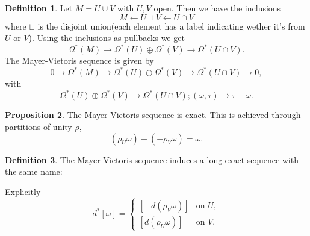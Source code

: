 \documentclass[twocolumn]{article}
\theoremstyle{definition}
\newtheorem{definition}{Definition}[section]
\newtheorem{proposition}[definition]{Proposition}
\theoremstyle{remark}
\begin{document}
\begin{definition}
    Let $M = U \cup V$ with $U, V$ open. Then we have the inclusions
    \begin{equation}
        M \leftarrow U \sqcup V \leftarrow U \cap V
    \end{equation}
    where $\sqcup$ is the disjoint union(each element has a label indicating wether it's from $U$ or $V$).
    Using the inclusions as pullbacks we get
    \begin{equation}
        \Omega^*(M) \rightarrow \Omega^*(U) \oplus \Omega^*(V) \rightarrow \Omega^*(U \cap V).
    \end{equation}
    The Mayer-Vietoris sequence is given by
    \begin{equation}
        0 \rightarrow \Omega^*(M) \rightarrow \Omega^*(U) \oplus \Omega^*(V) \rightarrow \Omega^*(U \cap V) \rightarrow 0,
    \end{equation}
    with
    \begin{equation}
        \Omega^*(U) \oplus \Omega^*(V) \rightarrow \Omega^*(U \cap V); (\omega, \tau) \mapsto \tau - \omega.
    \end{equation}
\end{definition}
\begin{proposition}
    The Mayer-Vietoris sequence is exact. This is achieved through partitions of unity $\rho$,
    \begin{equation}
        (\rho_U \omega) - (-\rho_V \omega) = \omega.
    \end{equation}
\end{proposition}
\begin{definition}
    The Mayer-Vietoris sequence induces a long exact sequence with the same name:
    \begin{center}
    \end{center}
    Explicitly
    \begin{equation}
        d^*[\omega] = 
        \begin{cases}
            [-d(\rho_V\omega)] & \textrm{on } U,\\
            [d(\rho_U\omega)] & \textrm{on } V.
        \end{cases}
    \end{equation}
\end{definition}
\end{document}
